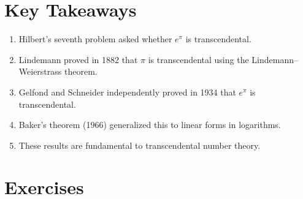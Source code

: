 \section*{Key Takeaways}

\begin{enumerate}
    \item Hilbert's seventh problem asked whether $e^{\pi}$ is transcendental.
    \item Lindemann proved in 1882 that $\pi$ is transcendental using the Lindemann--Weierstrass theorem.
    \item Gelfond and Schneider independently proved in 1934 that $e^{\pi}$ is transcendental.
    \item Baker's theorem (1966) generalized this to linear forms in logarithms.
    \item These results are fundamental to transcendental number theory.
\end{enumerate}

\section*{Exercises}


